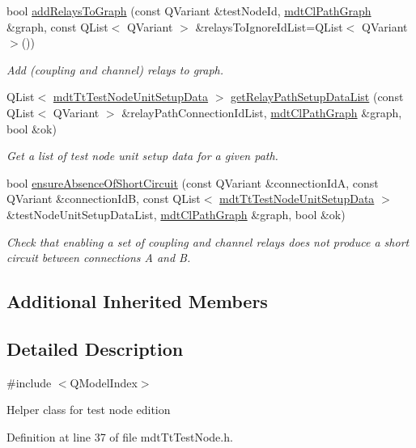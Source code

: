 \begin{DoxyCompactItemize}
bool \hyperlink{classmdt_tt_test_node_ade83e368a3cff8fe6704e3c194d5e211}{add\-Relays\-To\-Graph} (const Q\-Variant \&test\-Node\-Id, \hyperlink{classmdt_cl_path_graph}{mdt\-Cl\-Path\-Graph} \&graph, const Q\-List$<$ Q\-Variant $>$ \&relays\-To\-Ignore\-Id\-List=Q\-List$<$ Q\-Variant $>$())
\begin{DoxyCompactList}\small\item\em Add (coupling and channel) relays to graph. \end{DoxyCompactList}\item 
Q\-List$<$ \hyperlink{classmdt_tt_test_node_unit_setup_data}{mdt\-Tt\-Test\-Node\-Unit\-Setup\-Data} $>$ \hyperlink{classmdt_tt_test_node_a2953e3744cd95cab94ef35a7fb308d12}{get\-Relay\-Path\-Setup\-Data\-List} (const Q\-List$<$ Q\-Variant $>$ \&relay\-Path\-Connection\-Id\-List, \hyperlink{classmdt_cl_path_graph}{mdt\-Cl\-Path\-Graph} \&graph, bool \&ok)
\begin{DoxyCompactList}\small\item\em Get a list of test node unit setup data for a given path. \end{DoxyCompactList}\item 
bool \hyperlink{classmdt_tt_test_node_a0e96e3c1ab7b93ec5b7f2b02be44a1ff}{ensure\-Absence\-Of\-Short\-Circuit} (const Q\-Variant \&connection\-Id\-A, const Q\-Variant \&connection\-Id\-B, const Q\-List$<$ \hyperlink{classmdt_tt_test_node_unit_setup_data}{mdt\-Tt\-Test\-Node\-Unit\-Setup\-Data} $>$ \&test\-Node\-Unit\-Setup\-Data\-List, \hyperlink{classmdt_cl_path_graph}{mdt\-Cl\-Path\-Graph} \&graph, bool \&ok)
\begin{DoxyCompactList}\small\item\em Check that enabling a set of coupling and channel relays does not produce a short circuit between connections A and B. \end{DoxyCompactList}\end{DoxyCompactItemize}
\subsection*{Additional Inherited Members}


\subsection{Detailed Description}
\#include $<$\-Q\-Model\-Index$>$ 

Helper class for test node edition 

Definition at line 37 of file mdt\-Tt\-Test\-Node.\-h.



